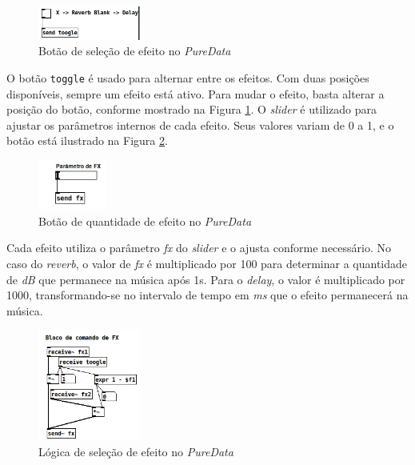 \begin{figure}[h]
    \centering
    \includegraphics[width=0.3\textwidth]{figuras/fig46.png}
    \caption{Botão de seleção de efeito no \textit{PureData}}
    \label{fig46}
\end{figure}

O botão \texttt{toggle} é usado para alternar entre os efeitos. Com duas posições disponíveis, sempre um efeito está ativo. Para mudar o efeito, basta alterar a posição do botão, conforme mostrado na Figura \ref{fig46}. 
O \textit{slider} é utilizado para ajustar os parâmetros internos de cada efeito. Seus valores variam de 0 a 1, e o botão está ilustrado na Figura \ref{fig47}.

\begin{figure}[h]
    \centering
    \includegraphics[width=0.2\textwidth]{figuras/fig47.png}
    \caption{Botão de quantidade de efeito no \textit{PureData}}
    \label{fig47}
\end{figure}



Cada efeito utiliza o parâmetro \textit{fx} do \textit{slider} e o ajusta conforme necessário. No caso do \textit{reverb}, o valor de \textit{fx} é multiplicado por 100 para determinar a quantidade de \textit{dB} que permanece na música após 1s. Para o \textit{delay}, o valor é multiplicado por 1000, transformando-se no intervalo de tempo em \textit{ms} que o efeito permanecerá na música.

\begin{figure}[h]
    \centering
    \includegraphics[width=0.3\textwidth]{figuras/fig48.png}
    \caption{Lógica de seleção de efeito no \textit{PureData}}
    \label{fig48}
\end{figure}



